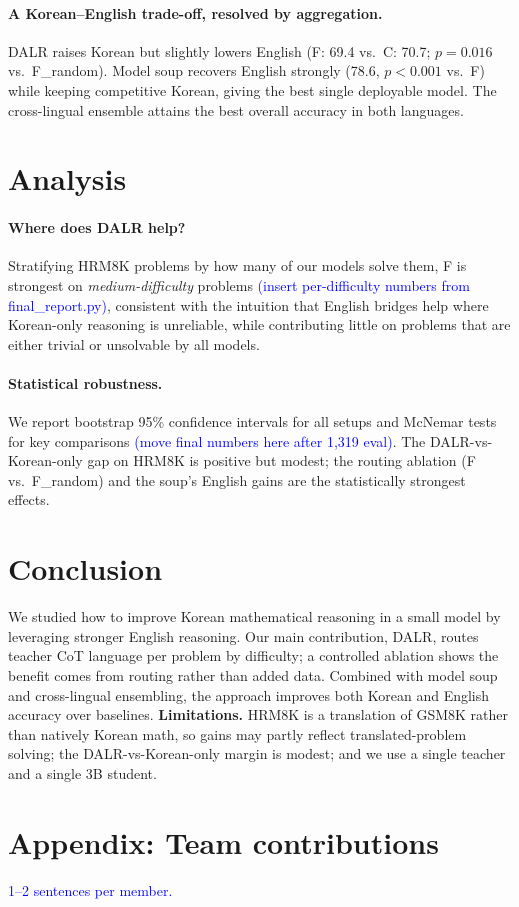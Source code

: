 \documentclass{article}
\newcommand{\note}[1]{\textcolor{blue}{{#1}}}
\begin{document}
\paragraph{A Korean--English trade-off, resolved by aggregation.}
DALR raises Korean but slightly lowers English (F: 69.4 vs.\ C: 70.7;
$p{=}0.016$ vs.\ F\_random). Model soup recovers English strongly (78.6,
$p{<}0.001$ vs.\ F) while keeping competitive Korean, giving the best
single deployable model. The cross-lingual ensemble attains the best
overall accuracy in both languages.

\section{Analysis}
\label{sec:analysis}

\paragraph{Where does DALR help?}
Stratifying HRM8K problems by how many of our models solve them, F is
strongest on \emph{medium-difficulty} problems
\note{(insert per-difficulty numbers from final\_report.py)}, consistent
with the intuition that English bridges help where Korean-only reasoning
is unreliable, while contributing little on problems that are either
trivial or unsolvable by all models.

\paragraph{Statistical robustness.}
We report bootstrap 95\% confidence intervals for all setups and McNemar
tests for key comparisons \note{(move final numbers here after 1,319
eval)}. The DALR-vs-Korean-only gap on HRM8K is positive but modest; the
routing ablation (F vs.\ F\_random) and the soup's English gains are the
statistically strongest effects.

\section{Conclusion}
\label{sec:conclusion}
We studied how to improve Korean mathematical reasoning in a small model
by leveraging stronger English reasoning. Our main contribution, DALR,
routes teacher CoT language per problem by difficulty; a controlled
ablation shows the benefit comes from routing rather than added data.
Combined with model soup and cross-lingual ensembling, the approach
improves both Korean and English accuracy over baselines.
\textbf{Limitations.} HRM8K is a translation of GSM8K rather than
natively Korean math, so gains may partly reflect translated-problem
solving; the DALR-vs-Korean-only margin is modest; and we use a single
teacher and a single 3B student.




\newpage
\appendix

\section{Appendix: Team contributions}
\note{1--2 sentences per member.}
\end{document}
